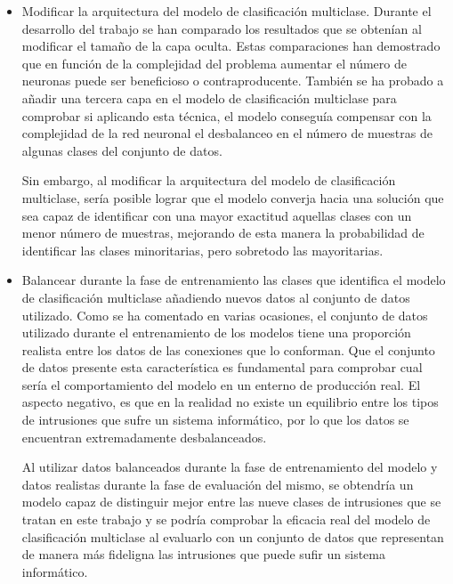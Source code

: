 \begin{itemize}
	\item Modificar la arquitectura del modelo de clasificación multiclase. Durante el desarrollo del trabajo se han comparado los resultados que se obtenían al modificar el tamaño de la capa oculta. Estas comparaciones han demostrado que en función de la complejidad del problema aumentar el número de neuronas puede ser beneficioso o contraproducente. También se ha probado a añadir una tercera capa en el modelo de clasificación multiclase para comprobar si aplicando esta técnica, el modelo conseguía compensar con la complejidad de la red neuronal el desbalanceo en el número de muestras de algunas clases del conjunto de datos. 
	
	Sin embargo, al modificar la arquitectura del modelo de clasificación multiclase, sería posible lograr que el modelo converja hacia una solución que sea capaz de identificar con una mayor exactitud aquellas clases con un menor número de muestras, mejorando de esta manera la probabilidad de identificar las clases minoritarias, pero sobretodo las mayoritarias.
	
	\item Balancear durante la fase de entrenamiento las clases que identifica el modelo de clasificación multiclase añadiendo nuevos datos al conjunto de datos utilizado. Como se ha comentado en varias ocasiones, el conjunto de datos utilizado durante el entrenamiento de los modelos tiene una proporción realista entre los datos de las conexiones que lo conforman. Que el conjunto de datos presente esta característica es fundamental para comprobar cual sería el comportamiento del modelo en un enterno de producción real. El aspecto negativo, es que en la realidad no existe un equilibrio entre los tipos de intrusiones que sufre un sistema informático, por lo que los datos se encuentran extremadamente desbalanceados.
	
	Al utilizar datos balanceados durante la fase de entrenamiento del modelo y datos realistas durante la fase de evaluación del mismo, se obtendría un modelo capaz de distinguir mejor entre las nueve clases de intrusiones que se tratan en este trabajo y se podría comprobar la eficacia real del modelo de clasificación multiclase al evaluarlo con un conjunto de datos que representan de manera más fideligna las intrusiones que puede sufir un sistema informático.
	

\end{itemize}
